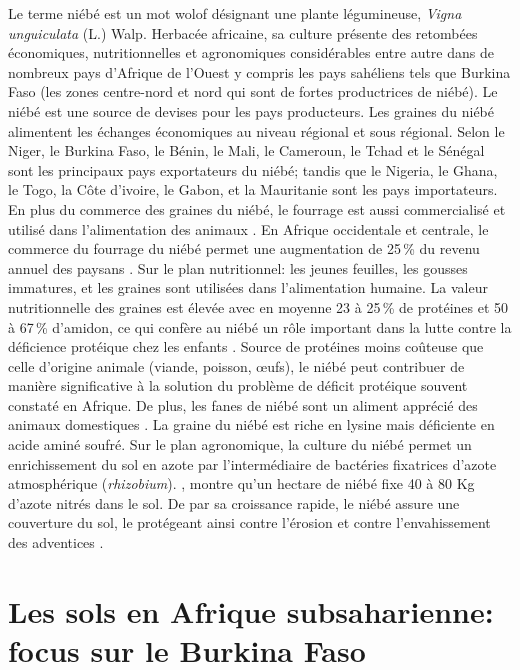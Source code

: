 \documentclass[a4paper,11pt]{article}
\begin{document}
Le terme niébé est un mot wolof désignant une plante légumineuse,
\emph{Vigna unguiculata} (L.) Walp. Herbacée africaine, sa culture
présente des retombées économiques, nutritionnelles et agronomiques
considérables entre autre dans de nombreux pays d'Afrique de l'Ouest y
compris les pays sahéliens tels que Burkina Faso (les zones
centre-nord et nord qui sont de fortes productrices de niébé).  Le
niébé est une source de devises pour les pays producteurs. Les graines
du niébé alimentent les échanges économiques au niveau régional et
sous régional. Selon \citeauthor{Langyintuo_2003}
\citeyear{Langyintuo_2003} le Niger, le Burkina Faso, le Bénin, le
Mali, le Cameroun, le Tchad et le Sénégal sont les principaux pays
exportateurs du niébé; tandis que le Nigeria, le Ghana, le Togo, la
Côte d'ivoire, le Gabon, et la Mauritanie sont les pays
importateurs. En plus du commerce des graines du niébé, le fourrage
est aussi commercialisé et utilisé dans l'alimentation des animaux
\cite{Langyintuo_2003}. En Afrique occidentale et centrale, le
commerce du fourrage du niébé permet une augmentation de 25\,\% du
revenu annuel des paysans \cite{Quin_1997}. Sur le plan nutritionnel:
les jeunes feuilles, les gousses immatures, et les graines sont
utilisées dans l'alimentation humaine. La valeur nutritionnelle des
graines est élevée avec en moyenne 23 à 25\,\% de protéines et 50 à
67\,\% d'amidon, ce qui confère au niébé un rôle important dans la
lutte contre la déficience protéique chez les enfants
\cite{Quin_1997}. Source de protéines moins coûteuse que celle
d'origine animale (viande, poisson, œufs), le niébé peut contribuer de
manière significative à la solution du problème de déficit protéique
souvent constaté en Afrique. De plus, les fanes de niébé sont un
aliment apprécié des animaux domestiques \cite{BAMBARA_2008}. La
graine du niébé est riche en lysine mais déficiente en acide aminé
soufré. Sur le plan agronomique, la culture du niébé permet un
enrichissement du sol en azote par l'intermédiaire de bactéries
fixatrices d'azote atmosphérique
(\emph{rhizobium}). \citeauthor{Quin_1997}\citeyear{Quin_1997}, montre
qu'un hectare de niébé fixe 40 à 80 Kg d'azote nitrés dans le sol. De
par sa croissance rapide, le niébé assure une couverture du sol, le
protégeant ainsi contre l'érosion et contre l'envahissement des
adventices \cite{Sawadogo_2009}.

\section{Les sols en Afrique subsaharienne: focus sur le Burkina Faso}
\end{document}
